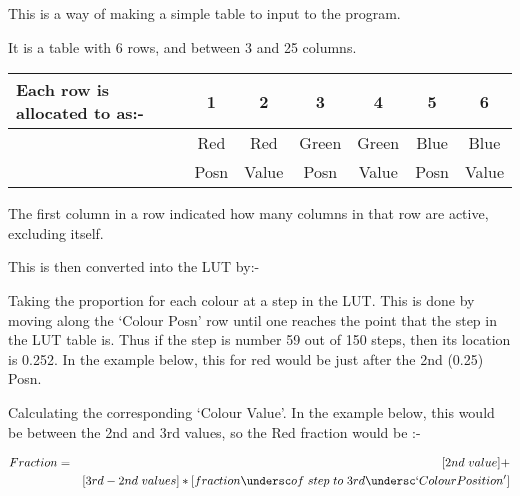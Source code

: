 \begin{small}
{{  This is a way of making a simple table to input to the program.
                                                                              
  It is a table with 6 rows, and between 3 and 25 columns.
             
\begin{tabular}{|l|c|c|c|c|c|c|} \hline 
  Each row is allocated to as:- &1      &2      &3       &4     
                                &5      &6 \\ \hline
                                &  Red &  Red  & Green &  Green&   Blue 
                                &  Blue \\
                               & Posn & Value &  Posn &  Value &  Posn & 
                               Value \\ \hline
\end{tabular}
                                                                              
  The first column in a row indicated how many columns in that row are
  active, excluding itself.
                                                                              
  This is then converted into the LUT by:-
                                                                              
  Taking the proportion for each colour at a step in the LUT. This
     is done by moving along the `Colour Posn' row until one reaches
     the point that the step in the LUT table is. Thus if the step is
     number 59 out of 150 steps, then its location is 0.252. In the
     example below, this for red would be just after the 2nd (0.25)
     Posn.

   Calculating the corresponding `Colour Value'. In the example below,
     this would be between the 2nd and 3rd values, so the Red fraction
     would be :-

\begin{eqnarray}
Fraction & = & [2nd{\hspace{0.3em}}value] + \nonumber \\
         &    & [3rd-2nd{\hspace{0.3em}}values]*[fraction{
       \undersc}of{\hspace{0.3em}}step{\hspace{0.3em}}to{\hspace{0.3em}}3rd{
       \undersc}`Colour Position'] \nonumber
\end{eqnarray}

}}
\end{small}
